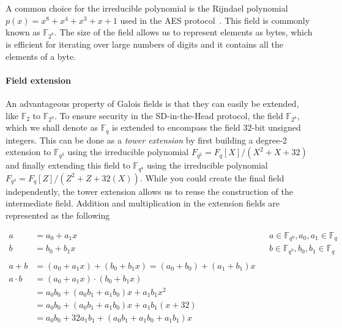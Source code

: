 \documentclass[11pt]{report}
\theoremstyle{definition}
\theoremstyle{plain}
\begin{document}
A common choice for the irreducible polynomial is the Rijndael polynomial $p(x) = x^8 + x^4 + x^3 + x + 1$ used in the AES protocol~\cite{brownadvanced}. This field is commonly known as $\mathbb{F}_{2^8}$. The size of the field allows us to represent elements as bytes, which is efficient for iterating over large numbers of digits and it contains all the elements of a byte.

\paragraph{Field extension}\label{sub:field_extension}

An advantageous property of Galois fields is that they can easily be extended, like $\mathbb{F}_{2}$ to $\mathbb{F}_{2^8}$. To ensure security in the SD-in-the-Head protocol, the field $\mathbb{F}_{2^8}$, which we shall denote as $\mathbb{F}_q$ is extended to encompass the field 32-bit unsigned integers. This can be done as a \textit{tower extension} by first building a degree-2 extension to $\mathbb{F}_{q^2}$ using the irreducible polynomial $F_{q^2} = F_q[X] / (X^2 + X + 32)$ and finally extending this field to $\mathbb{F}_{q^4}$ using the irreducible polynomial $F_{q^4} = F_q[Z] / (Z^2 + Z + 32(X))$. While you could create the final field independently, the tower extension allows us to reuse the construction of the intermediate field. Addition and multiplication in the extension fields are represented as the following

\begin{align*}
  a         & = a_0 + a_1x                                               &  & a \in \mathbb{F}_{q^\eta}, a_0, a_1 \in \mathbb{F}_q \\
  b         & = b_0 + b_1x                                               &  & b \in \mathbb{F}_{q^\eta}, b_0, b_1 \in \mathbb{F}_q \\\\
  a + b     & = (a_0 + a_1x) + (b_0 + b_1x) = (a_0 + b_0) + (a_1 + b_1)x                                                           \\
  a \cdot b & = (a_0 + a_1x) \cdot (b_0 + b_1x)                                                                                    \\
            & = a_0b_0 + (a_0b_1 + a_1b_0)x + a_1b_1x^2                                                                            \\
            & = a_0b_0 + (a_0b_1 + a_1b_0)x + a_1b_1(x + 32)                                                                       \\
            & = a_0b_0 + 32a_1b_1 + (a_0b_1 + a_1b_0 + a_1b_1)x
\end{align*}
\end{document}
